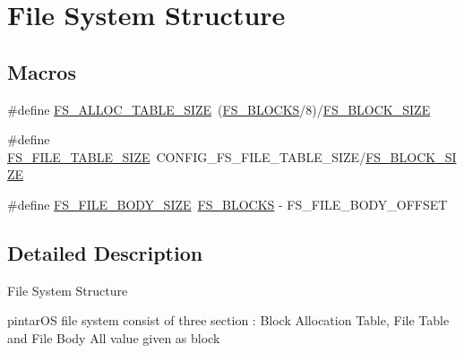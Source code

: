 \hypertarget{group__fs__structure}{\section{File System Structure}
\label{group__fs__structure}
}
\subsection*{Macros}
\begin{DoxyCompactItemize}
\item 
\#define \hyperlink{group__fs__structure_ga2a3310e42776399983998435e74a4173}{F\-S\-\_\-\-A\-L\-L\-O\-C\-\_\-\-T\-A\-B\-L\-E\-\_\-\-S\-I\-Z\-E}~(\hyperlink{group__fs_ga5534402cd21abf73c1851e468ca502c4}{F\-S\-\_\-\-B\-L\-O\-C\-K\-S}/8)/\hyperlink{group__fs_gad6b56bdbbe5838a6260ddc0926fa1891}{F\-S\-\_\-\-B\-L\-O\-C\-K\-\_\-\-S\-I\-Z\-E}
\item 
\#define \hyperlink{group__fs__structure_ga4bcf67d33f167440f0a2b1ea236b5261}{F\-S\-\_\-\-F\-I\-L\-E\-\_\-\-T\-A\-B\-L\-E\-\_\-\-S\-I\-Z\-E}~C\-O\-N\-F\-I\-G\-\_\-\-F\-S\-\_\-\-F\-I\-L\-E\-\_\-\-T\-A\-B\-L\-E\-\_\-\-S\-I\-Z\-E/\hyperlink{group__fs_gad6b56bdbbe5838a6260ddc0926fa1891}{F\-S\-\_\-\-B\-L\-O\-C\-K\-\_\-\-S\-I\-Z\-E}
\item 
\#define \hyperlink{group__fs__structure_ga4340411796330da232e2cc2af40fd00c}{F\-S\-\_\-\-F\-I\-L\-E\-\_\-\-B\-O\-D\-Y\-\_\-\-S\-I\-Z\-E}~\hyperlink{group__fs_ga5534402cd21abf73c1851e468ca502c4}{F\-S\-\_\-\-B\-L\-O\-C\-K\-S} -\/ F\-S\-\_\-\-F\-I\-L\-E\-\_\-\-B\-O\-D\-Y\-\_\-\-O\-F\-F\-S\-E\-T
\end{DoxyCompactItemize}


\subsection{Detailed Description}
File System Structure

pintar\-O\-S file system consist of three section \-: Block Allocation Table, File Table and File Body All value given as block 

